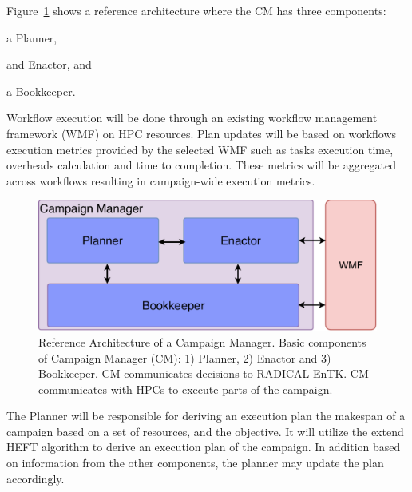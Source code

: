 Figure~\ref{fig:refarch} shows a reference architecture where the CM has three components:
\begin{inparaenum}[(1)]
\item a Planner,
\item and Enactor, and
\item a Bookkeeper. 
\end{inparaenum}
Workflow execution will be done through an existing workflow management framework (WMF) on HPC resources.
Plan updates will be based on workflows execution metrics provided by the selected WMF such as tasks execution time, overheads calculation and time to completion.
These metrics will be aggregated across workflows resulting in campaign-wide execution metrics.

\begin{figure}[t]
    \centering
    \includegraphics[width=.95\textwidth]{figures/CEM_design.pdf}
    \caption{Reference Architecture of a Campaign Manager. Basic 
    components of Campaign Manager (CM): 1) Planner, 2) Enactor and 3) Bookkeeper. 
    CM communicates decisions to RADICAL-EnTK. CM communicates with HPCs to 
    execute parts of the campaign.}\label{fig:refarch}
\end{figure}

The Planner will be responsible for deriving an execution plan   the makespan of a campaign based on a set of resources, and the objective.
It will utilize the extend HEFT algorithm to derive an execution plan of the campaign. 
In addition based on information from the other components, the planner may update the plan accordingly.

